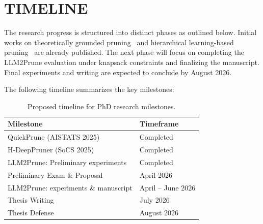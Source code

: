 \pagestyle{plain} %

\chapter{\uppercase{Timeline}} \label{chap:timeline}

The research progress is structured into distinct phases as outlined below. Initial works
on theoretically grounded pruning~\citep{pmlr-v258-nath25a} and hierarchical
learning-based pruning~\citep{nath2025hdeeppruner} are already published. The next phase
will focus on completing the LLM2Prune evaluation under knapsack
constraints and finalizing the manuscript. Final experiments and writing are expected to
conclude by August 2026.

The following timeline summarizes the key milestones:

\begin{table}[h!]
\centering
\begin{tabular}{|p{8cm}|p{7cm}|}
\hline
\textbf{Milestone} & \textbf{Timeframe} \\
\hline
QuickPrune (AISTATS 2025) & Completed \\
\hline
H-DeepPruner (SoCS 2025) & Completed \\
\hline
LLM2Prune: Preliminary experiments & Completed \\
\hline
Preliminary Exam \& Proposal & April 2026 \\
\hline
LLM2Prune: experiments \& manuscript & April -- June 2026 \\
\hline
Thesis Writing & July 2026 \\
\hline
Thesis Defense & August 2026 \\
\hline
\end{tabular}
\caption{Proposed timeline for PhD research milestones.}
\end{table}